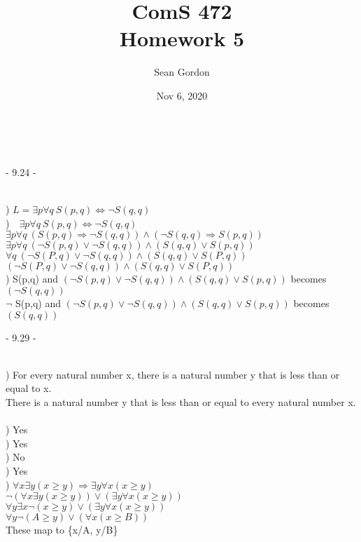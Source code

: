 \documentclass[12pt]{article}
\title{ComS 472\\Homework 5}
\author{Sean Gordon}
\date{Nov 6, 2020}
\begin{document}
\maketitle

\ \\
\centerline{- 9.24 - }
\ \\
) $L = \exists p \forall q \ S(p, q) \Leftrightarrow \neg S(q, q)$\\

)\ \  $\exists p \forall q \ S(p, q) \Leftrightarrow \neg S(q, q) $\\[.4em]
\indent $\exists p \forall q \ (S(p, q) \Rightarrow \neg S(q, q)) \wedge (\neg S(q, q) \Rightarrow S(p, q))$\\[.4em]
\indent $\exists p \forall q \ (\neg  S(p, q) \vee \neg S(q, q)) \wedge (S(q, q) \vee S(p, q))$\\[.4em]
\indent $\forall q \ (\neg  S(P, q) \vee \neg S(q, q)) \wedge (S(q, q) \vee S(P, q))$\\[.4em]
\indent $(\neg  S(P, q) \vee \neg S(q, q)) \wedge (S(q, q) \vee S(P, q))$\\

) S(p,q) and $(\neg S(p, q) \vee \neg S(q, q)) \wedge (S(q, q) \vee S(p, q))$ becomes $(\neg S(q, q))$\\[.4em]
\indent $\neg$ S(p,q) and $(\neg S(p, q) \vee \neg S(q, q)) \wedge (S(q, q) \vee S(p, q))$ becomes $(S(q, q))$\\



\noindent \hrulefill \pagebreak



\centerline{- 9.29 - }
\ \\
) For every natural number x, there is a natural number y that is less than or equal to x.\\[.4em]
\indent There is a natural number y that is less than or equal to every natural number x.\\\\
) Yes\\[.4em]
) Yes\\[.4em]
) No\\[.4em]
) Yes\\

) $\forall x \exists y (x \ge y) \Rightarrow \exists y \forall x (x \ge y)$\\[.4em]
\indent $\neg(\forall x \exists y (x \ge y)) \vee (\exists y \forall x (x \ge y))$\\[.4em]
\indent $\forall y \exists x \neg(x \ge y) \vee (\exists y \forall x (x \ge y))$\\[.4em]
\indent $\forall y \neg(A \ge y) \vee (\forall x (x \ge B))$\\[.4em]
\indent These map to \{x/A, y/B\}\\
\end{document}
